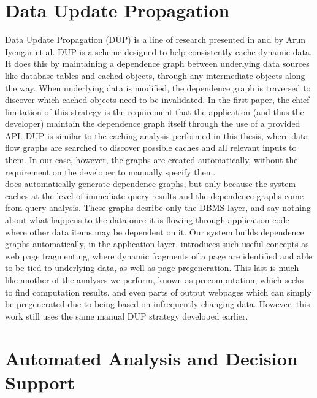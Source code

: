 \documentclass[msc,oneside]{ubcthesis}
\begin{document}
\section{Data Update Propagation}

	Data Update Propagation (DUP) is a line of research presented in \cite{Challenger1999} \cite{Degenaro2000} \cite{Challenger2001} \cite{Challenger2004} and \cite{Challenger2005} by Arun Iyengar et al. DUP is a scheme designed to help consistently cache dynamic data. It does this by maintaining a dependence graph between underlying data sources like database tables and cached objects, through any intermediate objects along the way. When underlying data is modified, the dependence graph is traversed to discover which cached objects need to be invalidated. In the first paper, the chief limitation of this strategy is the requirement that the application (and thus the developer) maintain the dependence graph itself through the use of a provided API. DUP is similar to the caching analysis performed in this thesis, where data flow graphs are searched to discover possible caches and all relevant inputs to them. In our case, however, the graphs are created automatically, without the requirement on the developer to manually specify them. \\

	\cite{Degenaro2000} does automatically generate dependence graphs, but only because the system caches at the level of immediate query results and the dependence graphs come from query analysis. These graphs desribe only the DBMS layer, and say nothing about what happens to the data once it is flowing through application code where other data items may be dependent on it. Our system builds dependence graphs automatically, in the application layer. \cite{Challenger2001} introduces such useful concepts as web page fragmenting, where dynamic fragments of a page are identified and able to be tied to underlying data, as well as page pregeneration. This last is much like another of the analyses we perform, known as precomputation, which seeks to find computation results, and even parts of output webpages which can simply be pregenerated due to being based on infrequently changing data. However, this work still uses the same manual DUP strategy developed earlier.

\section{Automated Analysis and Decision Support}
	
\end{document}
